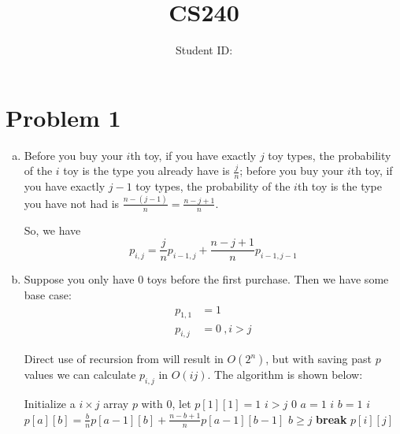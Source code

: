 \documentclass{article}
\title{CS240 \exerciseset}
\author{\studentname \qquad Student ID: \suid}
\begin{document}
\maketitle

\section*{Problem 1}

\begin{enumerate}[(a)]
\item %
Before you buy your $i$th toy, if you have exactly $j$ toy types, 
the probability of the $i$ toy is the type you already have is $\frac{j}{n}$;
before you buy your $i$th toy, if you have exactly $j-1$ toy types, 
the probability of the $i$th toy is the type you have not had is $\frac{n-(j-1)}{n}=\frac{n-j+1}{n}$.

So, we have 
\begin{equation*}
    p_{i,j}=\frac{j}{n}p_{i-1,j}+\frac{n-j+1}{n}p_{i-1,j-1}    
\end{equation*}

\item %
Suppose you only have 0 toys before the first purchase.
Then we have some base case:
\begin{align*}
    p_{1,1} &= 1\\
    p_{i,j} &= 0 \ , i>j
\end{align*}

Direct use of recursion from will result in $O(2^n)$, 
but with saving past $p$ values we can calculate $p_{i,j}$ in $O(ij)$.
The algorithm is shown below:
\begin{codebox}
\li Initialize a $i\times j$ array $p$ with $0$, let $p[1][1]=1$
\li \If $i > j$
\li \Then \Return $0$
    \End
\li \For $a=1$ \To $i$
\li \Do
    \For $b=1$ \To $i$
\li \Do $p[a][b]=\frac{b}{n}p[a-1][b]+\frac{n-b+1}{n}p[a-1][b-1]$
\li     \If $b\geqslant j$
\li     \Then \textbf{break}
        \End
    \End
    \End
\li \Return $p[i][j]$
\end{codebox}
\end{enumerate}
\pagebreak
\end{document}
